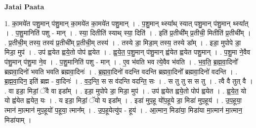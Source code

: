 \documentclass[17pt]{extarticle}
\begin{document}
\textbf{Jatai Paata} \newline

1. का॒मये॑त पशु॒मान् प॑शु॒मान् का॒मये॑त का॒मये॑त पशु॒मान् । . प॒शु॒मान् थ्स्या᳚थ् स्यात् पशु॒मान् प॑शु॒मान् थ्स्या᳚त् । . प॒शु॒मानिति॑ पशु - मान् । . स्या॒ दितीति॑ स्याथ् स्या॒ दिति॑ । . इति॑ प्र॒तीची᳚म् प्र॒तीची॒ मितीति॑ प्र॒तीची᳚म् । . प्र॒तीची॒म् तस्य॒ तस्य॑ प्र॒तीची᳚म् प्र॒तीची॒म् तस्य॑ । . तस्ये डा॒ मिडा॒म् तस्य॒ तस्ये डा᳚म् । . इडा॒ मुपोपे डा॒ मिडा॒ मुप॑ । . उप॑ ह्वयेत ह्वये॒तो पोप॑ ह्वयेत । . ह्व॒ये॒त॒ प॒शु॒मान् प॑शु॒मान् ह्व॑येत ह्वयेत पशु॒मान् । . प॒शु॒मा ने॒वैव प॑शु॒मान् प॑शु॒मा ने॒व । . प॒शु॒मानिति॑ पशु - मान् । . ए॒व भ॑वति भव त्ये॒वैव भ॑वति । . भ॒व॒ति॒ ब्र॒ह्म॒वा॒दिनो᳚ ब्रह्मवा॒दिनो॑ भवति भवति ब्रह्मवा॒दिनः॑ । . ब्र॒ह्म॒वा॒दिनो॑ वदन्ति वदन्ति ब्रह्मवा॒दिनो᳚ ब्रह्मवा॒दिनो॑ वदन्ति । . ब्र॒ह्म॒वा॒दिन॒ इति॑ ब्रह्म - वा॒दिनः॑ । . व॒द॒न्ति॒ स स व॑दन्ति वदन्ति॒ सः । . स तु तु स स तु । . त्वै वै तुत् वै । . वा इडा॒ मिडां॒ ॅवै वा इडा᳚म् । . इडा॒ मुपोपे डा॒ मिडा॒ मुप॑ । . उप॑ ह्वयेत ह्वये॒तो पोप॑ ह्वयेत । . ह्व॒ये॒त॒ यो यो ह्व॑येत ह्वयेत॒ यः । . य इडा॒ मिडां॒ ॅयो य इडा᳚म् । . इडा॑ मुप॒हू यो॑प॒हूये डा॒ मिडा॑ मुप॒हूय॑ । . उ॒प॒हूया॒ त्मान॑ मा॒त्मान॑ मुप॒हूयो॑ प॒हूया॒ त्मान᳚म् । . उ॒प॒हूयेत्यु॑प - हूय॑ । . आ॒त्मान॒ मिडा॑या॒ मिडा॑या मा॒त्मान॑ मा॒त्मान॒ मिडा॑याम् । \newline
\end{document}
